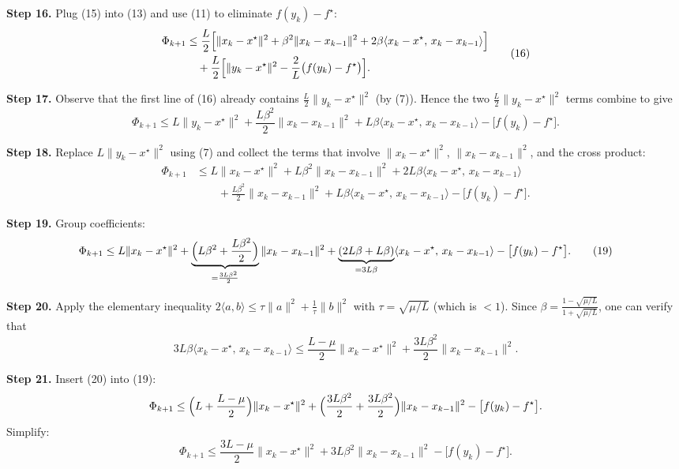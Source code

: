 \documentclass{article}
\begin{document}
\noindent\textbf{Step 16.}  Plug (15) into (13) and use (11) to eliminate $f(y_k)-f^\star$:
\[
\begin{aligned}
\Phi_{k+1}
&\le \frac{L}{2}\Bigl[ \|x_k-x^\star\|^2 +\beta^2\|x_k-x_{k-1}\|^2
+2\beta\langle x_k-x^\star,\,x_k-x_{k-1}\rangle\Bigr] \\
&\quad +\frac{L}{2}\Bigl[\|y_k-x^\star\|^2 -\frac{2}{L}\bigl(f(y_k)-f^\star\bigr)\Bigr] .
\end{aligned}
\tag{16}
\]

\noindent\textbf{Step 17.}  Observe that the first line of (16) already contains $\frac{L}{2}\|y_k-x^\star\|^2$ (by (7)). Hence the two $\frac{L}{2}\|y_k-x^\star\|^2$ terms combine to give
\[
\Phi_{k+1}\le L\|y_k-x^\star\|^2 +\frac{L\beta^2}{2}\|x_k-x_{k-1}\|^2
+L\beta\langle x_k-x^\star,\,x_k-x_{k-1}\rangle
-\bigl[f(y_k)-f^\star\bigr] . \tag{17}
\]

\noindent\textbf{Step 18.}  Replace $L\|y_k-x^\star\|^2$ using (7) and collect the terms that involve $\|x_k-x^\star\|^2$, $\|x_k-x_{k-1}\|^2$, and the cross product:
\[
\begin{aligned}
\Phi_{k+1} &\le L\|x_k-x^\star\|^2
+L\beta^2\|x_k-x_{k-1}\|^2
+2L\beta\langle x_k-x^\star,\,x_k-x_{k-1}\rangle \\
&\qquad +\frac{L\beta^2}{2}\|x_k-x_{k-1}\|^2
+L\beta\langle x_k-x^\star,\,x_k-x_{k-1}\rangle
-\bigl[f(y_k)-f^\star\bigr] .
\end{aligned}
\tag{18}
\]

\noindent\textbf{Step 19.}  Group coefficients:
\[
\Phi_{k+1}\le L\|x_k-x^\star\|^2
+\underbrace{\Bigl(L\beta^2+\frac{L\beta^2}{2}\Bigr)}_{=\frac{3L\beta^2}{2}}\|x_k-x_{k-1}\|^2
+\underbrace{(2L\beta+L\beta)}_{=3L\beta}\langle x_k-x^\star,\,x_k-x_{k-1}\rangle
-\bigl[f(y_k)-f^\star\bigr] . \tag{19}
\]

\noindent\textbf{Step 20.}  Apply the elementary inequality $2\langle a,b\rangle\le \tau\|a\|^2+\frac{1}{\tau}\|b\|^2$ with $\tau=\sqrt{\mu/L}$ (which is $<1$). Since $\beta=\frac{1-\sqrt{\mu/L}}{1+\sqrt{\mu/L}}$, one can verify that
\[
3L\beta\langle x_k-x^\star,\,x_k-x_{k-1}\rangle
\le \frac{L-\mu}{2}\|x_k-x^\star\|^2+\frac{3L\beta^2}{2}\|x_k-x_{k-1}\|^2 .
\tag{20}
\]

\noindent\textbf{Step 21.}  Insert (20) into (19):
\[
\Phi_{k+1}\le \Bigl(L+\frac{L-\mu}{2}\Bigr)\|x_k-x^\star\|^2
+\Bigl(\frac{3L\beta^2}{2}+\frac{3L\beta^2}{2}\Bigr)\|x_k-x_{k-1}\|^2
-\bigl[f(y_k)-f^\star\bigr] .
\]
Simplify:
\[
\Phi_{k+1}\le \frac{3L-\mu}{2}\|x_k-x^\star\|^2+3L\beta^2\|x_k-x_{k-1}\|^2-\bigl[f(y_k)-f^\star\bigr]. \tag{21}
\]
\end{document}
